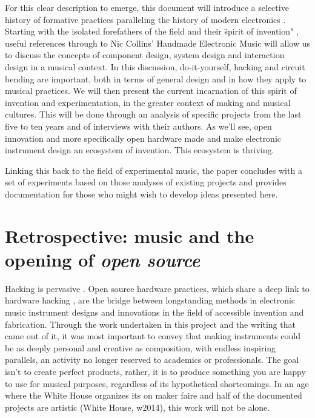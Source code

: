 	For this clear description to emerge, this document will introduce a selective history of formative practices paralleling the history of modern electronics \citep{holmes2002}. Starting with the isolated forefathers of the field and their \"spirit of invention" \citep{dunn2001}, useful references through to Nic Collins' Handmade Electronic Music \citep{collins2006} will allow us to discuss the concepts of component design, system design and interaction design in a musical context. In this discussion, do-it-yourself, hacking and circuit bending are important, both in terms of general design and in how they apply to musical practices. We will then present the current incarnation of this spirit of invention and experimentation, in the greater context of making and musical cultures. This will be done through an analysis of specific projects from the last five to ten years and of interviews with their authors. As we'll see, open innovation \citep{christensen2005} and more specifically open hardware made and make electronic instrument design an ecosystem of invention. This ecosystem is thriving. 

	Linking this back to the field of experimental music, the paper concludes with a set of experiments based on those analyses of existing projects and provides documentation for those who might wish to develop ideas presented here.

\section{Retrospective: music and the opening of \emph{open source}}

Hacking is pervasive \citep{paradiso2008}. Open source hardware practices, which share a deep link to hardware hacking \citep{williams2012}, are the bridge between longstanding methods in electronic music instrument designs and innovations in the field of accessible invention and fabrication. Through the work undertaken in this project and the writing that came out of it, it was most important to convey that making instruments could be as deeply personal and creative as composition, with endless inspiring parallels, an activity no longer reserved to academics or professionals. The goal isn't to create perfect products, rather, it is to produce something you are happy to use for musical purposes, regardless of its hypothetical shortcomings. In an age where the White House organizes its on maker faire and half of the documented projects are artistic (White House, w2014), this work will not be alone.
	

